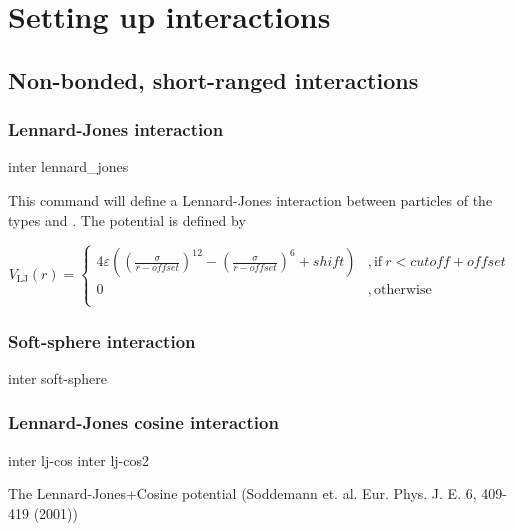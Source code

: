 \chapter{Setting up interactions}
\label{sec:inter}

\section{Non-bonded, short-ranged interactions}
\label{sec:inter-nb}

\subsection{Lennard-Jones interaction}

\begin{essyntax}
  inter  
  lennard_jones 
  \var{$\epsilon$} \var{$\sigma$} 
    
\end{essyntax}
This command will define a Lennard-Jones interaction between particles
of the types  and .  The potential is defined by

\begin{equation}
  V_\mathrm{LJ}(r) = \left\{
    \begin{array}{ll}
      4\varepsilon((\frac{\sigma}{r-\mathit{offset}})^{12}
      -(\frac{\sigma}{r-\mathit{offset}})^6+\mathit{shift}) 
      & \mathrm{, if~} r < \mathit{cutoff}+\mathit{offset}\\
      \mathit{0} 
      & \mathrm{, otherwise}\\
    \end{array}
  \right.
\end{equation}

\subsection{Soft-sphere interaction}
\begin{essyntax}
  inter   
  soft-sphere    
\end{essyntax}

\subsection{Lennard-Jones cosine interaction}
\begin{essyntax}
  inter   lj-cos
     
  inter   lj-cos2
     \var{$\omega$}
\end{essyntax}
The Lennard-Jones+Cosine potential 
(Soddemann et. al. Eur. Phys. J. E. 6, 409-419 (2001))

